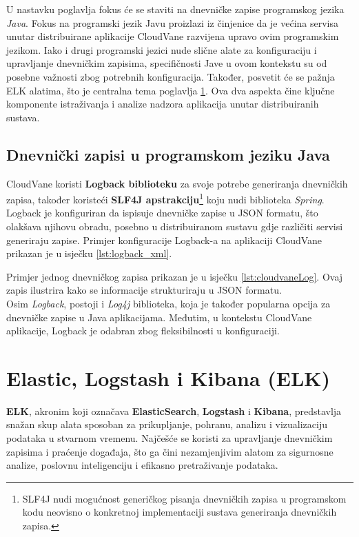 \documentclass[times, utf8, diplomski]{fer}
\begin{document}
U nastavku poglavlja fokus će se staviti na dnevničke zapise programskog jezika \emph{Java}. Fokus na programski jezik Javu proizlazi iz činjenice da je većina servisa unutar distribuirane aplikacije CloudVane razvijena upravo ovim programskim jezikom. Iako i drugi programski jezici nude slične alate za konfiguraciju i upravljanje dnevničkim zapisima, specifičnosti Jave u ovom kontekstu su od posebne važnosti zbog potrebnih konfiguracija. Također, posvetit će se pažnja ELK alatima, što je centralna tema poglavlja \ref{sec:elk}. Ova dva aspekta čine ključne komponente istraživanja i analize nadzora aplikacija unutar distribuiranih sustava.


\subsection{Dnevnički zapisi u programskom jeziku Java}
\label{sec:java}

CloudVane koristi \textbf{Logback biblioteku} za svoje potrebe generiranja dnevničkih zapisa, također koristeći \textbf{SLF4J apstrakciju}\footnote{SLF4J nudi mogućnost generičkog pisanja dnevničkih zapisa u programskom kodu neovisno o konkretnoj implementaciji sustava generiranja dnevničkih zapisa.} koju nudi biblioteka \emph{Spring}. Logback je konfiguriran da ispisuje dnevničke zapise u JSON formatu, što olakšava njihovu obradu, posebno u distribuiranom sustavu gdje različiti servisi generiraju zapise. Primjer konfiguracije Logback-a na aplikaciji CloudVane prikazan je u isječku \ref{lst:logback_xml}.

Primjer jednog dnevničkog zapisa prikazan je u isječku \ref{lst:cloudvaneLog}. Ovaj zapis ilustrira kako se informacije strukturiraju u JSON formatu.\\

Osim \emph{Logback}, postoji i \emph{Log4j} biblioteka, koja je također popularna opcija za dnevničke zapise u Java aplikacijama. Međutim, u kontekstu CloudVane aplikacije, Logback je odabran zbog fleksibilnosti u konfiguraciji.


\section{Elastic, Logstash i Kibana (ELK)}
\label{sec:elk}

\textbf{ELK}, akronim koji označava \textbf{ElasticSearch}, \textbf{Logstash} i \textbf{Kibana}, predstavlja snažan skup alata sposoban za prikupljanje, pohranu, analizu i vizualizaciju podataka u stvarnom vremenu. Najčešće se koristi za upravljanje dnevničkim zapisima i praćenje događaja, što ga čini nezamjenjivim alatom za sigurnosne analize, poslovnu inteligenciju i efikasno pretraživanje podataka.
\end{document}
